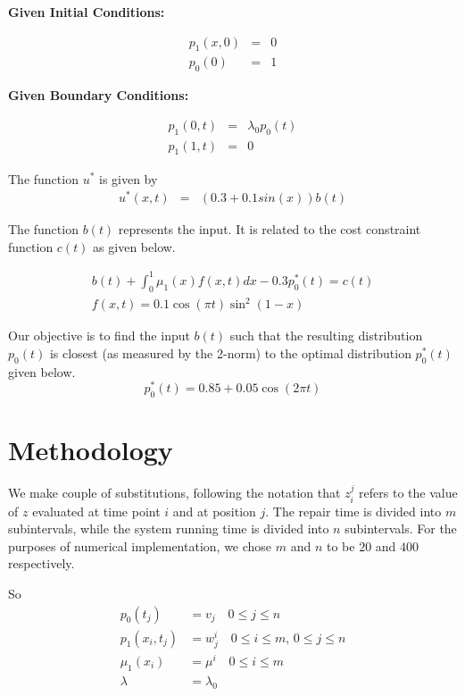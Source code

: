 \documentclass{ifacconf}
\begin{document}
\textbf{Given Initial Conditions:}

\begin{eqnarray}
p_1(x,0) &=& 0\\
p_0(0) &=& 1
\end{eqnarray}

\textbf{Given Boundary Conditions:}

\begin{eqnarray}
p_1(0,t) &=& \lambda_0 p_0(t)\\
p_1(1,t) &=& 0
\end{eqnarray}

The function $u^*$ is given by
\begin{eqnarray}
u^{*}(x,t) &=& (0.3+0.1 sin(x))b(t) 
\end{eqnarray}

The function $b(t)$ represents the input. It is related to the cost constraint function
$c(t)$ as given below.

\begin{eqnarray}
b(t)+\int_0^1\mu_1(x)f(x,t)dx -0.3p_0^{*}(t) = c(t)\\
f(x,t) = 0.1\cos(\pi t)\sin^2(1-x)
\end{eqnarray}

Our objective is to find the input $b(t)$ such that the resulting distribution $p_0(t)$ is
closest (as measured by the 2-norm) to the optimal distribution $p_0^*(t)$ given below.
\begin{equation}
p_0^{*}(t) = 0.85+0.05\cos(2\pi t)
\end{equation}

\section{Methodology}
\label{sec:method}

We make couple of substitutions, following the notation that
$z_i^j$ refers to the value of $z$ evaluated at time point $i$ and at position $j$. The
repair time is divided into $m$ subintervals, while the system running time is divided
into $n$ subintervals. For the purposes of numerical implementation, we chose $m$ and $n$
to be $20$ and $400$ respectively.

So 
\begin{align}
p_0(t_j) &= v_j \quad 0 \le j \le n\\
p_1(x_i,t_j) &= w_j^i \quad 0 \le i \le m, \, 0\le j \le n\\
\mu_1(x_i) &= \mu^i \quad 0 \le i \le m\\
\lambda &= \lambda_0 \\ 
\end{align} 
\end{document}
